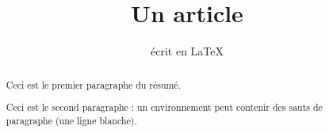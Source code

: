 \documentclass[]{article}
\title{Un article}
\author{écrit en \LaTeX}
\begin{document}
\maketitle%


\begin{abstract}%
	Ceci est le premier paragraphe du résumé.

	Ceci est le second paragraphe : un environnement peut contenir des sauts de paragraphe (une ligne blanche).
\end{abstract}

	\lipsum[1-3]
\end{document}
